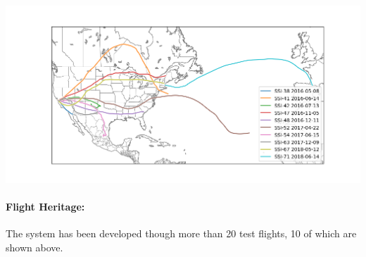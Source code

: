 \documentclass[12pt, twocolumn]{article}
\begin{document}
{\footnotesize  
\vspace{0.4cm}
\begin{center}
\noindent\includegraphics[width=\linewidth,trim={2.9cm 1.3cm 2cm 1.5cm},clip]{allflights.png}
\end{center}
\vspace{-.5cm} 
\paragraph{\sffamily Flight Heritage:} The system has been developed though more than 20 test flights, 10 of which are shown above.%

}
\end{document}
